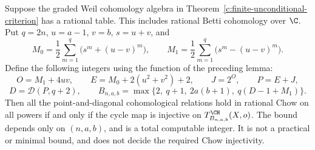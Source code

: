 \begin{corollary}
\label{c:uniform-arity-bound}
Suppose the graded Weil cohomology algebra in
Theorem~\ref{c:finite-unconditional-criterion} has a rational
table.  This includes rational Betti cohomology over $\C$.
Put $q=2n$, $u=a-1$, $v=b$, $s=u+v$, and
\[
 M_0=\frac12\sum_{m=1}^{q}\bigl(s^m+(u-v)^m\bigr),\qquad
 M_1=\frac12\sum_{m=1}^{q}\bigl(s^m-(u-v)^m\bigr).
\]
Define the following integers using the function of the preceding
lemma:
\[
 O=M_1+4uv,\qquad
 E=M_0+2(u^2+v^2)+2,\qquad
 J=2^O,\qquad P=E+J,
\]
\[
 D=\mathcal D(P,q+2),\qquad
 B_{n,a,b}=\max\{2,\ q+1,\ 2a(b+1),\ q(D-1+M_1)\}.
\]
Then all the point-and-diagonal cohomological relations hold in
rational Chow on all powers if and only if the cycle map is
injective on $T_{B_{n,a,b}}^{\CH}(X,o)$.
The bound depends only on $(n,a,b)$, and is a total computable
integer.  It is not a practical or minimal bound, and does not
decide the required Chow injectivity.
\end{corollary}


